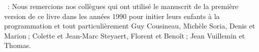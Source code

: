 \vfill
{}~: Nous remercions nos collègues qui ont utilisé le
manuscrit de la première version de ce livre dans les années 1990
pour initier leurs enfants à la programmation et tout
particulièrement Guy Cousineau, Michèle Soria,  Denis et
Marion$\:$; Colette et Jean-Marc Steyaert, Florent et Benoît$\:$; 
Jean Vuillemin et Thomas.